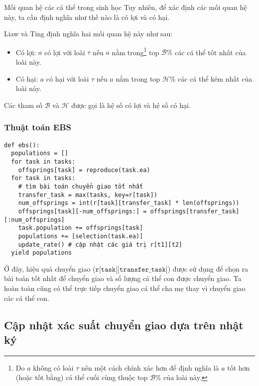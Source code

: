 \begin{frame}{Mối quan hệ các cá thể trong sinh học}
  Tuy nhiên, để xác định các mối quan hệ này, ta cần định nghĩa như thế nào là
  có lợi và có hại.
  
  Liaw và Ting định nghĩa hai mối quan hệ này như sau:
  \begin{itemize}
  \item Có lợi: \( a \) có lợi với loài \( \tau \) nếu \( a \) nằm
    trong\footnote{Do \( a \) không có loài \( \tau \) nên một cách chính xác
    hơn để định nghĩa là \( a \) tốt hơn (hoặc tốt bằng) cá thể cuối cùng thuộc top \(
  \mathcal{B}\% \) của loài này.} top \(
    \mathcal{B}\%\) các cá thể tốt nhất của loài này.
  \item Có hại: \( a \) có hại với loài \( \tau \) nếu \( a \) nằm trong top \(
    \mathcal{H}\% \) các cá thể kém nhất của loài này.
  \end{itemize}

  Các tham số \( \mathcal{B} \) và \( \mathcal{H} \) được gọi là hệ số có lợi và
  hệ số có hại.
\end{frame}
\begin{frame}[fragile]
\frametitle{Thuật toán EBS}
\begin{verbatim}
def ebs():
  populations = []
  for task in tasks:
    offsprings[task] = reproduce(task.ea)
  for task in tasks:
    # tìm bài toán chuyển giao tốt nhất
    transfer_task = max(tasks, key=r[task])
    num_offsprings = int(r[task][transfer_task] * len(offsprings))
    offsprings[task][-num_offsprings:] = offsprings[transfer_task][:num_offsprings]
    task.population += offsprings[task]
    populations += [selection(task.ea)]
    update_rate() # cập nhật các giá trị r[t1][t2]
  yield populations
\end{verbatim}

Ở đây, hiệu quả chuyển giao (\( \texttt{r[task][transfer\_task]} \)) được sử
dụng để chọn ra bài toán tốt nhất để chuyển giao và số lượng cá thể con được
chuyển giao. Ta hoàn toàn cũng có thể trực tiếp chuyển giao cá thể cha mẹ thay
vì chuyển giao các cá thể con.
\end{frame}

\subsection{Cập nhật xác suất chuyển giao dựa trên nhật ký} %
\label{sub:Cập nhật xác suất chuyển giao dựa trên nhật ký}

